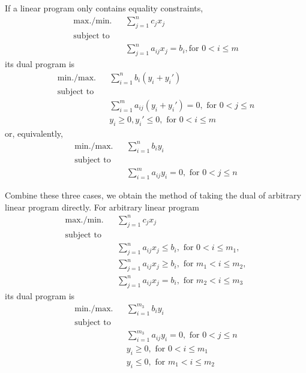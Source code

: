 \documentclass[a4paper,11pt,twocolumn]{article}
\begin{document}
  If a linear program only contains equality constraints,
  \begin{align*}
    \text{max./min.} && \sum_{j = 1}^{n} c_j x_j \\
    \text{subject to} \\
    && \sum_{j = 1}^{n} a_{ij} x_j = b_i, \text{for } 0 < i \leq m
  \end{align*}
  its dual program is
  \begin{align*}
    \text{min./max.} && \sum_{i = 1}^{n} b_i(y_i + y_i') \\
    \text{subject to} \\
    && \sum_{i = 1}^{m} a_{ij} (y_i + y_i') = 0 , \text{ for } 0 < j \leq n \\
    && y_i \geq 0, y_i' \leq 0, \text{ for } 0 < i \leq m
  \end{align*}
  or, equivalently,
  \begin{align*}
    \text{min./max.} && \sum_{i = 1}^{n} b_i y_i \\
    \text{subject to} \\
    && \sum_{i = 1}^{m} a_{ij} y_i = 0 , \text{ for } 0 < j \leq n
  \end{align*}

  Combine these three cases, we obtain the method of taking the dual of arbitrary linear program directly. For arbitrary linear program
  \begin{align*}
    \text{max./min.} && \sum_{j = 1}^{n} c_j x_j \\
    \text{subject to} \\
    && \sum_{j = 1}^{n} a_{ij} x_j \leq b_i, \text{ for } 0 < i \leq m_1, \\
    && \sum_{j = 1}^{n} a_{ij} x_j \geq b_i, \text{ for } m_1 < i \leq m_2, \\
    && \sum_{j = 1}^{n} a_{ij} x_j = b_i, \text{ for } m_2 < i \leq m_3
  \end{align*}
  its dual program is
  \begin{align*}
    \text{min./max.} && \sum_{i = 1}^{m_3} b_iy_i \\
    \text{subject to} \\
    && \sum_{i = 1}^{m_3} a_{ij} y_i  = 0, \text{ for } 0 < j \leq n \\
    && y_i \geq 0, \text{ for } 0 < i \leq m_1 \\
    && y_i \leq 0, \text{ for } m_1 < i \leq m_2
  \end{align*}
\end{document}
